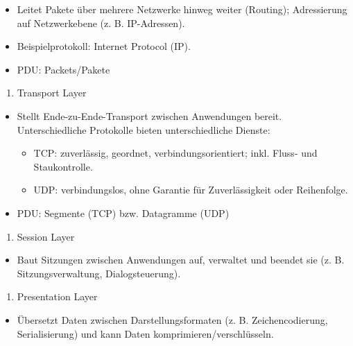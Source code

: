 \documentclass[
  nswissgerman,
  a4paper,
  DIV=11,
  numbers=noendperiod,
  ngerman]{scrreprt}
\providecommand{\tightlist}{%
  \setlength{\itemsep}{0pt}\setlength{\parskip}{0pt}}
\begin{document}
\begin{itemize}
\tightlist
\item
  Leitet Pakete über mehrere Netzwerke hinweg weiter (Routing);
  Adressierung auf Netzwerkebene (z. B. IP-Adressen).
\item
  Beispielprotokoll: Internet Protocol (IP).
\item
  PDU: Packets/Pakete
\end{itemize}

\begin{enumerate}
\def\labelenumi{\arabic{enumi})}
\setcounter{enumi}{3}
\tightlist
\item
  Transport Layer
\end{enumerate}

\begin{itemize}
\tightlist
\item
  Stellt Ende-zu-Ende-Transport zwischen Anwendungen bereit.
  Unterschiedliche Protokolle bieten unterschiedliche Dienste:

  \begin{itemize}
  \tightlist
  \item
    TCP: zuverlässig, geordnet, verbindungsorientiert; inkl. Fluss- und
    Staukontrolle.
  \item
    UDP: verbindungslos, ohne Garantie für Zuverlässigkeit oder
    Reihenfolge.
  \end{itemize}
\item
  PDU: Segmente (TCP) bzw. Datagramme (UDP)
\end{itemize}

\begin{enumerate}
\def\labelenumi{\arabic{enumi})}
\setcounter{enumi}{4}
\tightlist
\item
  Session Layer
\end{enumerate}

\begin{itemize}
\tightlist
\item
  Baut Sitzungen zwischen Anwendungen auf, verwaltet und beendet sie (z.
  B. Sitzungsverwaltung, Dialogsteuerung).
\end{itemize}

\begin{enumerate}
\def\labelenumi{\arabic{enumi})}
\setcounter{enumi}{5}
\tightlist
\item
  Presentation Layer
\end{enumerate}

\begin{itemize}
\tightlist
\item
  Übersetzt Daten zwischen Darstellungsformaten (z. B. Zeichencodierung,
  Serialisierung) und kann Daten komprimieren/verschlüsseln.
\end{itemize}
\end{document}
